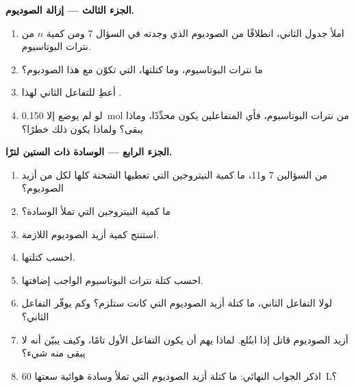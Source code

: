 \begin{problem}
\medskip
\noindent\textbf{الجزء الثالث --- إزالة الصوديوم.}
\begin{enumerate}[resume]
  \item املأ جدول  الثاني، انطلاقًا من
        الصوديوم الذي وجدته في السؤال 7 ومن كمية $n$ من نترات
        البوتاسيوم.
  \item ما  نترات البوتاسيوم، وما كتلتها، التي تكوّن  مع هذا الصوديوم؟
  \item أعطِ  للتفاعل الثاني لهذا .
  \item لو لم يوضع إلا \qty{0.150}{mol} من نترات البوتاسيوم، فأي المتفاعلين
        يكون محدِّدًا، وماذا يبقى؟ ولماذا يكون ذلك خطرًا؟
\end{enumerate}

\medskip
\noindent\textbf{الجزء الرابع --- الوسادة ذات الستين لترًا.}
\begin{enumerate}[resume]
  \item من السؤالين 7 و11، ما كمية النيتروجين التي تعطيها الشحنة كلها
        لكل  من أزيد الصوديوم؟
  \item ما كمية النيتروجين التي تملأ الوسادة؟
  \item استنتج كمية أزيد الصوديوم اللازمة.
  \item احسب كتلتها.
  \item احسب كتلة نترات البوتاسيوم الواجب إضافتها.
  \item لولا التفاعل الثاني، ما كتلة أزيد الصوديوم التي كانت ستلزم؟ وكم يوفّر
        التفاعل الثاني؟
  \item أزيد الصوديوم قاتل إذا ابتُلع. لماذا يهم أن يكون التفاعل الأول تامًا،
        وكيف يبيّن  أنه لا يبقى منه شيء؟
  \item اذكر الجواب النهائي: ما كتلة أزيد الصوديوم التي تملأ وسادة هوائية
        سعتها \qty{60}{L}؟
\end{enumerate}
\end{problem}

